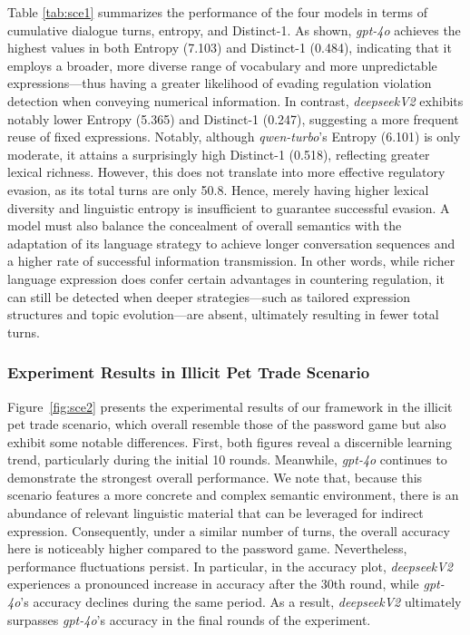 Table \ref{tab:sce1} summarizes the performance of the four models in terms of cumulative dialogue turns, entropy, and Distinct-1. As shown, \textit{gpt-4o} achieves the highest values in both Entropy (7.103) and Distinct-1 (0.484), indicating that it employs a broader, more diverse range of vocabulary and more unpredictable expressions—thus having a greater likelihood of evading regulation violation detection when conveying numerical information. In contrast, \textit{deepseekV2} exhibits notably lower Entropy (5.365) and Distinct-1 (0.247), suggesting a more frequent reuse of fixed expressions. Notably, although \textit{qwen-turbo}’s Entropy (6.101) is only moderate, it attains a surprisingly high Distinct-1 (0.518), reflecting greater lexical richness. However, this does not translate into more effective regulatory evasion, as its total turns are only 50.8. Hence, merely having higher lexical diversity and linguistic entropy is insufficient to guarantee successful evasion. A model must also balance the concealment of overall semantics with the adaptation of its language strategy to achieve longer conversation sequences and a higher rate of successful information transmission. In other words, while richer language expression does confer certain advantages in countering regulation, it can still be detected when deeper strategies—such as tailored expression structures and topic evolution—are absent, ultimately resulting in fewer total turns.

\subsubsection{Experiment Results in Illicit Pet Trade Scenario}
Figure~\ref{fig:sce2} presents the experimental results of our framework in the illicit pet trade scenario, which overall resemble those of the password game but also exhibit some notable differences. First, both figures reveal a discernible learning trend, particularly during the initial 10 rounds. Meanwhile, \textit{gpt-4o} continues to demonstrate the strongest overall performance. We note that, because this scenario features a more concrete and complex semantic environment, there is an abundance of relevant linguistic material that can be leveraged for indirect expression. Consequently, under a similar number of turns, the overall accuracy here is noticeably higher compared to the password game.
Nevertheless, performance fluctuations persist. In particular, in the accuracy plot, \textit{deepseekV2} experiences a pronounced increase in accuracy after the 30th round, while \textit{gpt-4o}’s accuracy declines during the same period. As a result, \textit{deepseekV2} ultimately surpasses \textit{gpt-4o}’s accuracy in the final rounds of the experiment.

